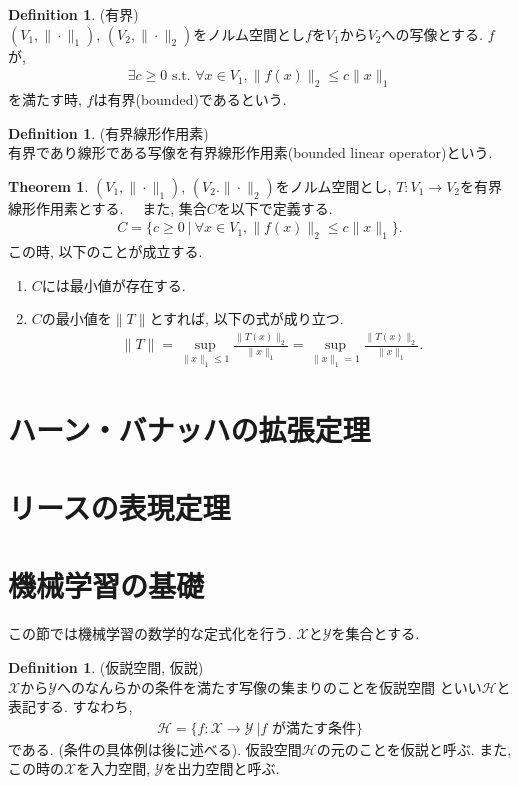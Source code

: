 \documentclass[11pt, a4paper, dvipdfmx]{jsarticle}
\theoremstyle{definition}
\newtheorem{Definition+}[Axiom+]{Definition}
\newtheorem{Theorem+}[Axiom+]{Theorem}
\newcommand{\X}{\mathcal{X}}
\newcommand{\Y}{\mathcal{Y}}
\newcommand{\Hil}{\mathcal{H}}
\begin{document}
\begin{Definition+}(有界)\\
    $(V_{1}, \|\cdot\|_{1})$, $(V_{2}, \|\cdot\|_{2})$をノルム空間とし$f$を$V_{1}$から$V_{2}$への写像とする.
    $f$が,
    \begin{align*}
        \exists c\geq 0\text{ s.t. }\forall x\in V_{1}, \|f(x)\|_{2}\leq c\|x\|_{1}
    \end{align*}
    を満たす時, $f$は有界(bounded)であるという.
\end{Definition+}

\begin{Definition+}(有界線形作用素)\\
    有界であり線形である写像を有界線形作用素(bounded linear operator)という.
\end{Definition+}
\newpage
\begin{Theorem+}
    $(V_{1}, \|\cdot\|_{1})$, $(V_2. \|\cdot\|_{2})$をノルム空間とし, $T:V_1\to V_2$を有界線形作用素とする.　
    また, 集合$C$を以下で定義する.
    \begin{align*}
        C = \{c\geq 0~|~\forall x\in V_{1}, \|f(x)\|_{2}\leq c\|x\|_{1}\}.
    \end{align*}
    この時, 以下のことが成立する.
    \begin{enumerate}
        \item $C$には最小値が存在する.
        \item $C$の最小値を$\|T\|$とすれば, 以下の式が成り立つ.
         \begin{align*}
             \|T\| = \sup_{\|x\|_{1}\leq 1}\frac{\|T(x)\|_{2}}{\|x\|_{1}} = \sup_{\|x\|_{1} = 1}\frac{\|T(x)\|_{2}}{\|x\|_{1}}.
         \end{align*}
    \end{enumerate}
\end{Theorem+}

\section{ハーン・バナッハの拡張定理}
\section{リースの表現定理}
\section{機械学習の基礎}
この節では機械学習の数学的な定式化を行う. $\X$と$\Y$を集合とする.
\begin{Definition+}(仮説空間, 仮説)\\
    $\X$から$\Y$へのなんらかの条件を満たす写像の集まりのことを仮説空間
    といい$\Hil$と表記する. すなわち,
    \begin{align*}
        \Hil = \{f:\X\to\Y~| f\text{ が満たす条件}\}
    \end{align*}
    である. (条件の具体例は後に述べる). 仮設空間$\Hil$の元のことを仮説と呼ぶ.
    また, この時の$\X$を入力空間, $\Y$を出力空間と呼ぶ.
\end{Definition+}
\end{document}
